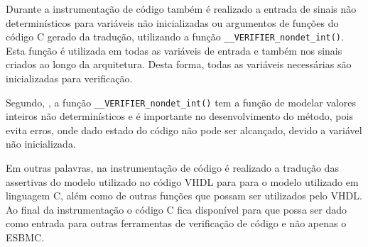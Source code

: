 \par
Durante a instrumentação de código também é realizado a entrada de sinais não determinísticos para variáveis não inicializadas ou argumentos de funções do código C gerado da tradução, utilizando a função \texttt{\_\_VERIFIER\_nondet\_int()}. Esta função é utilizada em todas as variáveis de entrada e também nos sinais criados ao longo da arquitetura. Desta forma, todas as variáveis necessárias são inicializadas para verificação.

\par
Segundo, , a função \texttt{\_\_VERIFIER\_nondet\_int()} tem a função de modelar valores inteiros não determinísticos e é importante no desenvolvimento do método, pois evita erros, onde dado estado do código não pode ser alcançado, devido a variável não inicializada.

\par
Em outras palavras, na instrumentação de código é realizado a tradução das assertivas do modelo utilizado no código VHDL para para o modelo utilizado em linguagem C, além como de outras funções que possam ser utilizados pelo VHDL. Ao final da instrumentação o código C fica disponível para que possa ser dado como entrada para outras ferramentas de verificação de código e não apenas o ESBMC.

